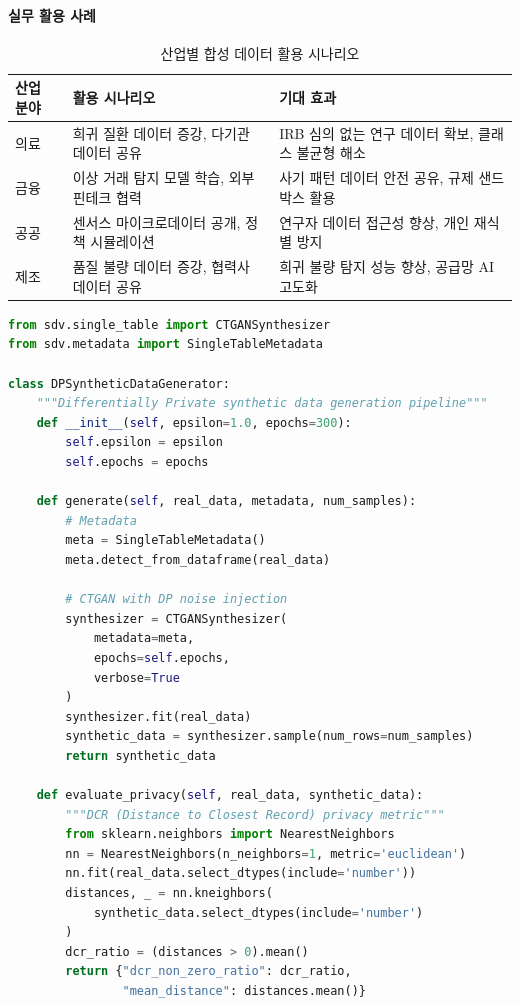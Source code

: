 \paragraph{실무 활용 사례}

\begin{table}[htbp]
\centering
\caption{산업별 합성 데이터 활용 시나리오}
\label{tab:synthetic_data_usecases}
\begin{tabularx}{\textwidth}{p{2cm}p{3.5cm}X}
\toprule
\textbf{산업 분야} & \textbf{활용 시나리오} & \textbf{기대 효과} \\
\midrule
의료 & 희귀 질환 데이터 증강, 다기관 데이터 공유 \cite{topol2019high} & IRB 심의 없는 연구 데이터 확보, 클래스 불균형 해소 \\
금융 & 이상 거래 탐지 모델 학습, 외부 핀테크 협력 & 사기 패턴 데이터 안전 공유, 규제 샌드박스 활용 \cite{oecd2024regulatory_ai_finance} \\
공공 & 센서스 마이크로데이터 공개, 정책 시뮬레이션 & 연구자 데이터 접근성 향상, 개인 재식별 방지 \\
제조 & 품질 불량 데이터 증강, 협력사 데이터 공유 & 희귀 불량 탐지 성능 향상, 공급망 AI 고도화 \\
\bottomrule
\end{tabularx}
\end{table}

\begin{lstlisting}[language=Python, caption={DP-Synthetic Data Generation using CTGAN with Differential Privacy}, label={lst:dp_synthetic}]
from sdv.single_table import CTGANSynthesizer
from sdv.metadata import SingleTableMetadata

class DPSyntheticDataGenerator:
    """Differentially Private synthetic data generation pipeline"""
    def __init__(self, epsilon=1.0, epochs=300):
        self.epsilon = epsilon
        self.epochs = epochs

    def generate(self, real_data, metadata, num_samples):
        # Metadata
        meta = SingleTableMetadata()
        meta.detect_from_dataframe(real_data)

        # CTGAN with DP noise injection
        synthesizer = CTGANSynthesizer(
            metadata=meta,
            epochs=self.epochs,
            verbose=True
        )
        synthesizer.fit(real_data)
        synthetic_data = synthesizer.sample(num_rows=num_samples)
        return synthetic_data

    def evaluate_privacy(self, real_data, synthetic_data):
        """DCR (Distance to Closest Record) privacy metric"""
        from sklearn.neighbors import NearestNeighbors
        nn = NearestNeighbors(n_neighbors=1, metric='euclidean')
        nn.fit(real_data.select_dtypes(include='number'))
        distances, _ = nn.kneighbors(
            synthetic_data.select_dtypes(include='number')
        )
        dcr_ratio = (distances > 0).mean()
        return {"dcr_non_zero_ratio": dcr_ratio,
                "mean_distance": distances.mean()}
\end{lstlisting}

